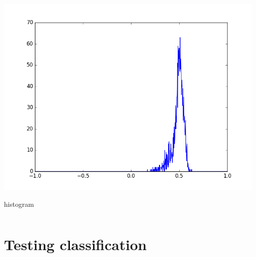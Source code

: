 \documentclass[c]{beamer}
\begin{document}
\begin{frame}
{\begin{columns}
\begin{column}{0.12\textwidth}
\begin{overlayarea}{\linewidth}{1.3cm}
    \centering\vfill
    \includegraphics[scale=0.07]{images/Porri/08_ndvi_histo.png}
  \end{overlayarea}
  \begin{overlayarea}{\linewidth}{0.5cm}
    \centering
    \tiny histogram \par
  \end{overlayarea}
 \end{column}
 
 
\end{columns}
}
\end{frame}




\section{Testing classification}
\begin{frame}
\tableofcontents[currentsection]
\end{frame}
\end{document}
